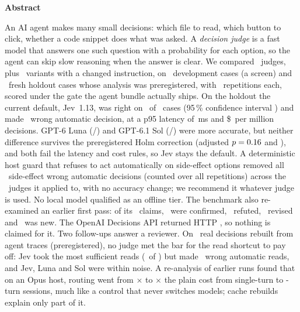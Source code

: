 \begin{center}\textbf{Abstract}\end{center}
\small
An AI agent makes many small decisions: which file to read, which button to click, whether a code
snippet does what was asked. A \emph{decision judge} is a fast model that answers one such question
with a probability for each option, so the agent can skip slow reasoning when the answer is clear.
We compared \NumBase\ judges, plus \NumClauseArms\ variants with a changed instruction, on
\DevN\ development cases (a screen) and \HoldN\ fresh holdout cases whose analysis was
preregistered, with \HoldReps\ repetitions each, scored under the gate the agent bundle actually
ships. On the holdout the current default, Jev~1.13, was right on \JevHoldAccK\ of \HoldN\ cases
(95\,\% confidence interval \JevHoldAccCI) and made \JevHoldWaK\ wrong automatic decision, at a
p95 latency of \JevHoldPninetyfive\,ms and \$\JevHoldCost\ per million decisions. GPT-6 Luna
(\LunaHoldAccK/\HoldN) and GPT-6.1 Sol (\SolHoldAccK/\HoldN) were more accurate, but neither
difference survives the preregistered Holm correction (adjusted $p = 0.16$ and
\SolHoldRAccPHolm), and both fail the latency and cost rules, so Jev stays the default.
A deterministic host guard that refuses to act automatically on side-effect options removed all
\ITwoHoldBefore\ side-effect wrong automatic decisions (counted over all repetitions) across the
\ITwoHoldNApplicable\ judges it applied to, with no accuracy change; we recommend it whatever judge is used. No local model
qualified as an offline tier. The benchmark also re-examined an earlier first pass: of its
\ChangesN\ claims, \ChangesConfirmed\ were confirmed, \ChangesRefuted\ refuted, \ChangesRevised\
revised and \ChangesNew\ was new. The OpenAI Decisions API returned HTTP \HoldProbeStatus, so
nothing is claimed for it. Two follow-ups answer a reviewer. On \TrN\ real decisions rebuilt from agent
traces (preregistered), no judge met the bar for the read shortcut to pay off: Jev took the most sufficient
reads (\TrJevReads\ of \TrReadCases) but made \TrJevWaK\ wrong automatic reads, and Jev, Luna and Sol were
within noise. A re-analysis of earlier runs found that on an Opus host, routing went from
\CaOpusRoutedOne$\times$ to \CaOpusRoutedFour$\times$ the plain cost from single-turn to
\CaTurns-turn sessions, much like a control that never switches models; cache rebuilds explain only part of it.
\normalsize
